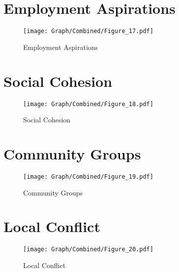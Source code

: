 \documentclass[10pt,a4paper]{article}
\begin{document}
\section{Employment Aspirations}
\begin{table}[H]\centering

\end{table}
\begin{figure}[H]\centering
\texttt{[image: Graph/Combined/Figure\_17.pdf]}
\caption{Employment Aspirations} \label{fig:Fig_17}
\end{figure}
\begin{table}[H]\centering

\end{table}
\pagebreak
\section{Social Cohesion}
\begin{table}[H]\centering

\end{table}
\begin{figure}[H]\centering
\texttt{[image: Graph/Combined/Figure\_18.pdf]}
\caption{Social Cohesion} \label{fig:Fig_18}
\end{figure}
\begin{table}[H]\centering

\end{table}
\pagebreak
\section{Community Groups}
\begin{table}[H]\centering

\end{table}
\begin{figure}[H]\centering
\texttt{[image: Graph/Combined/Figure\_19.pdf]}
\caption{Community Groups} \label{fig:Fig_19}
\end{figure}
\begin{table}[H]\centering

\end{table}
\pagebreak
\section{Local Conflict}
\begin{table}[H]\centering

\end{table}
\begin{figure}[H]\centering
\texttt{[image: Graph/Combined/Figure\_20.pdf]}
\caption{Local Conflict} \label{fig:Fig_20}
\end{figure}
\begin{table}[H]\centering

\end{table}
\pagebreak
\end{document}
